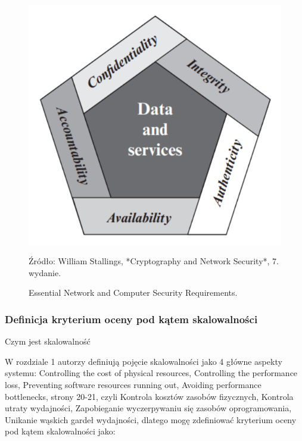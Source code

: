 \documentclass[runningheads,12pt]{llncs}
\begin{document}
\begin{figure}
    \includegraphics[width=\linewidth]{images/image-security.png}
    \caption{Essential Network and Computer Security Requirements.} \label{fig1}
    \vspace{0.5em}
    \begin{center}
        {\small Źródło: William Stallings, *Cryptography and Network Security*, 7. wydanie.}
    \end{center}
\end{figure}

\subsubsection{Definicja kryterium oceny pod kątem skalowalności}

Czym jest skalowalność 

W rozdziale 1 autorzy definiują pojęcie skalowalności jako 4 główne aspekty systemu: Controlling the cost of physical resources, Controlling the performance loss, Preventing software resources running out, Avoiding performance bottlenecks, strony 20-21, czyli Kontrola kosztów zasobów fizycznych, Kontrola utraty wydajności, Zapobieganie wyczerpywaniu się zasobów oprogramowania, Unikanie wąskich gardeł wydajności, dlatego mogę zdefiniować kryterium oceny pod kątem skalowalności jako: ~\cite[p. 21]{coulouris2011distributed}
\end{document}
